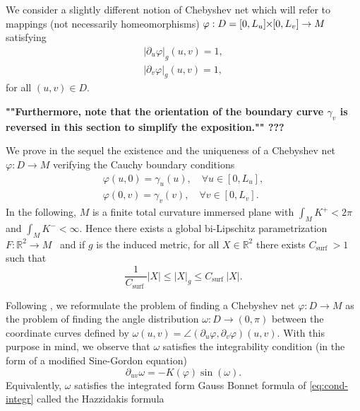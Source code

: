 \documentclass{article}
\newcommand{\DUV}{\partial_{uv}}
\newcommand{\Csurf}{C_{\text{surf }}}
\newcommand{\PLH}{{\mkern-1mu\times\mkern-1mu}}
\newcommand{\Times}{\PLH}
\newcommand{\R}{\mathbb{R}}
\newcommand{\surf}{M}
\newcommand{\DU}{\partial_{u}}
\newcommand{\DV}{\partial_{v}}
\theoremstyle{remark}
\theoremstyle{prpart}
\begin{document}
We consider a slightly different notion of Chebyshev net which will refer to mappings (not necessarily
 homeomorphisms) $\varphi: D=[0,L_u]\Times[0,L_v] \to\surf$ satisfying
\begin{subequations}\label{eq:cheb-def-c3}
\begin{align}\label{eq:cheb-def-c3a}
|\partial_u \varphi|_g(u,v) = 1,\\
|\partial_v \varphi|_g(u,v) = 1,\label{eq:cheb-def-c3b}
\end{align}
\end{subequations}
for all $(u,v)\in D$. 

{\bf  ""Furthermore, note that the orientation of the boundary curve $\gamma_v$ is reversed in this section to simplify the exposition."" ???}



We prove in the sequel the existence and the uniqueness of a Chebyshev net $\varphi:D\to\surf$ verifying the Cauchy boundary conditions
\begin{equation}\label{eq:cond-bord-c3}
\begin{split}
  \varphi(u,0)=\gamma_u(u),\quad\forall u\in[0,L_u],\\ 
  \varphi(0,v)=\gamma_v(v),\quad\forall v\in[0,L_v].
\end{split}
\end{equation}
In the following, $\surf$ is a finite total curvature immersed plane with $\int_\surf{K^+}<2\pi$
and $\int_\surf{K^-}<\infty$. Hence there exists a global bi-Lipschitz
parametrization $F: \R^2 \to \surf$~\cite{Bonk03} and if $g$ is the induced metric,
for all $X\in\R^2$ there exists $\Csurf>1$ such that
\begin{equation}\label{eq:equiv}
  \frac{1}{\Csurf}|X|\leq |X|_{g} \leq \Csurf|X|.
\end{equation}

Following \cite{Ghys09}, we reformulate the problem of finding a Chebyshev net $\varphi:D\to\surf$ as the problem of finding the angle distribution $\omega:D\to(0,\pi)$ between the coordinate curves defined by $\omega(u,v) = \angle(\DU\varphi, \DV\varphi)(u,v)$. With this purpose in mind, we observe that $\omega$ satisfies the integrability condition (in the form of a modified Sine-Gordon equation) \cite{Ghys09}
\begin{equation}  \label{eq:cond-integr}
  \DUV \omega = -K(\varphi) \sin(\omega).
\end{equation}
Equivalently, $\omega$ satisfies the integrated form Gauss Bonnet formula of \eqref{eq:cond-integr} called the Hazzidakis formula
\end{document}
